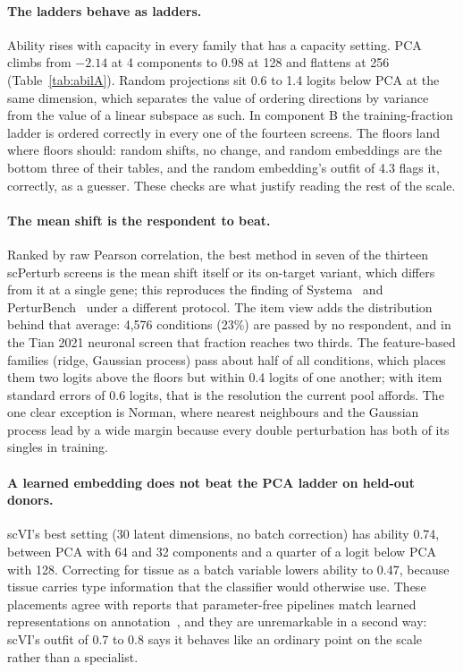 \documentclass[11pt]{article}
\begin{document}
\paragraph{The ladders behave as ladders.}
Ability rises with capacity in every family that has a capacity setting. PCA climbs
from $-2.14$ at 4 components to $0.98$ at 128 and flattens at 256
(Table~\ref{tab:abilA}). Random projections sit 0.6 to 1.4 logits below PCA at the
same dimension, which separates the value of ordering directions by variance from the
value of a linear subspace as such. In component B the training-fraction ladder is
ordered correctly in every one of the fourteen screens. The floors land where floors
should: random shifts, no change, and random embeddings are the bottom three of their
tables, and the random embedding's outfit of 4.3 flags it, correctly, as a guesser.
These checks are what justify reading the rest of the scale.

\paragraph{The mean shift is the respondent to beat.}
Ranked by raw Pearson correlation, the best method in seven of the thirteen
scPerturb screens is the mean shift itself or its on-target variant, which differs
from it at a single gene; this reproduces the finding of Systema~\cite{systema} and PerturBench~\cite{perturbench} under
a different protocol. The item view adds the distribution behind that average: 4,576
conditions (23\%) are passed by no respondent, and in the Tian 2021 neuronal screen
that fraction reaches two thirds. The feature-based families (ridge, Gaussian
process) pass about half of all conditions, which places them two logits above the
floors but within 0.4 logits of one another; with item standard errors of 0.6 logits,
that is the resolution the current pool affords. The one clear exception is Norman,
where nearest neighbours and the Gaussian process lead by a wide margin because every
double perturbation has both of its singles in training.

\paragraph{A learned embedding does not beat the PCA ladder on held-out donors.}
scVI's best setting (30 latent dimensions, no batch correction) has ability 0.74,
between PCA with 64 and 32 components and a quarter of a logit below PCA with 128.
Correcting for tissue as a batch variable lowers ability to 0.47, because tissue
carries type information that the classifier would otherwise use. These placements
agree with reports that parameter-free pipelines match learned representations on
annotation~\cite{kedzierska2025,souza2026}, and they are unremarkable in a second way: scVI's outfit of 0.7 to 0.8
says it behaves like an ordinary point on the scale rather than a specialist.
\end{document}
